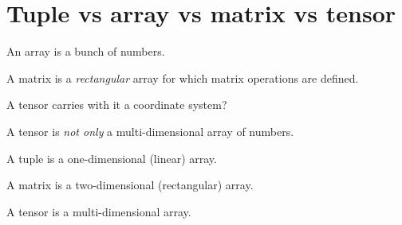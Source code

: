 \section{Tuple vs array vs matrix vs tensor}

An array is a bunch of numbers.

A matrix is a \emph{rectangular} array for which matrix operations are defined.

A tensor carries with it a coordinate system?

A tensor is \emph{not only} a multi-dimensional array of numbers.

A tuple is a one-dimensional (linear) array.

A matrix is a two-dimensional (rectangular) array.

A tensor is a multi-dimensional array.
